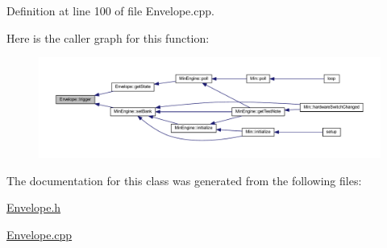 Definition at line 100 of file Envelope.\+cpp.

Here is the caller graph for this function\+:
\nopagebreak
\begin{figure}[H]
\begin{center}
\leavevmode
\includegraphics[width=350pt]{class_envelope_a03b0aeb7f8550ec701e3a07839ad47ec_icgraph}
\end{center}
\end{figure}


The documentation for this class was generated from the following files\+:\begin{DoxyCompactItemize}
\item 
\hyperlink{_envelope_8h}{Envelope.\+h}\item 
\hyperlink{_envelope_8cpp}{Envelope.\+cpp}\end{DoxyCompactItemize}
